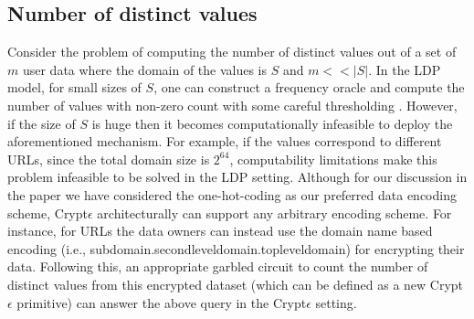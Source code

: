 \subsection*{Number of distinct values}
Consider the problem of computing the number of distinct values out of a set of $m$ user data where the domain of the values is $S$ and $m<<|S|$. In the \textsf{LDP} model, for small sizes of $S$, one can construct a frequency oracle and compute the number of values with non-zero count with some careful thresholding \cite{LDP1}. However, if the size of $S$ is huge then it becomes computationally infeasible to deploy the aforementioned mechanism. For example, if the values correspond to different URLs, since the total domain size is $2^{64}$, computability limitations make this problem infeasible to be solved in the \textsf{LDP} setting. Although for our discussion in the paper we have considered the one-hot-coding as our preferred data encoding scheme, Crypt$\epsilon$ architecturally can support any arbitrary encoding scheme.  For instance, for URLs the data owners can instead use the domain name based encoding (i.e., subdomain.secondleveldomain.topleveldomain) for encrypting their data. Following this, an appropriate garbled circuit to count the number of distinct values from this encrypted dataset (which can be defined as a new Crypt$\epsilon$ primitive) can answer the above query in the Crypt$\epsilon$ setting.

\begin{comment}\subsection{Answering queries with disjunctions in predicate} Now let us consider a DNF query predicate $\phi=\phi_1 \vee \phi_2$ where $\phi_1=(A_1==v_1 \wedge \ldots \wedge A_n==v_n)$ and $\phi_2=(A'_1==v'_1 \wedge \ldots \wedge A'_n==v'_n)$ are two conjunctive clauses. For a given record assume, \begin{gather*}\mathbf{d}=\mathbf{c_1}\oplus \mathbf{c_2}-labMult(\mathbf{c_1,c_2}) \\
\mathbf{c_1}=genLabMult(\mathbf{\tilde{R}}_{A1}[v_1], \ldots ,\mathbf{\tilde{R}}_{An}[v_n] ) \\ \mathbf{c_1}=genLabMult(\mathbf{\tilde{R}}_{A1}[v_1], \ldots ,\mathbf{\tilde{R}}_{An}[v_n] )\end{gather*} Note that $d=1$  only iff  the record satisfies $\phi$. Thus for a two clause  DNF predicate as above, the optimized Filter transformation takes as input $x \times y$ encrypted table $\tilde{\mathbf{T}}$ with attribute set $\bigcup_{i=1}^n Attribute(\phi_i)$ and outputs a $x \times 1$ encrypted table $\mathbf{\tilde{T}}'$ such that \begin{gather} \mathbf{\tilde{T}}'[i]= \mathbf{c_1}\oplus \mathbf{c_2}-labMult(\mathbf{c_1,c_2}) \\
\mathbf{c_1}=genLabMult(\mathbf{\tilde{R}}_{A1}[v_1], \ldots ,\mathbf{\tilde{R}}_{An}[v_n] ) \\ \mathbf{c_1}=genLabMult(\mathbf{\tilde{R}}_{A1}[v_1], \ldots ,\mathbf{\tilde{R}}_{An}[v_n] )\end{gather} For $t>2$ clauses in a DNF, apply the Filter transformation pairwise for $\lceil \log t \rceil$ iterations. 
\end{comment}